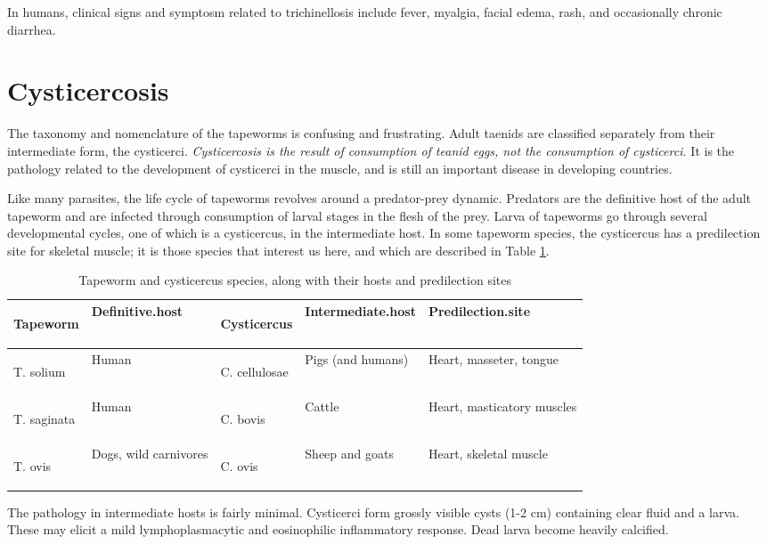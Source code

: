\documentclass[openany]{book}
\begin{document}
In humans, clinical signs and symptosm related to trichinellosis include
fever, myalgia, facial edema, rash, and occasionally chronic diarrhea.

\section{Cysticercosis}\label{cysticercosis}

The taxonomy and nomenclature of the tapeworms is confusing and
frustrating. Adult taenids are classified separately from their
intermediate form, the cysticerci. \emph{Cysticercosis is the result of
consumption of teanid eggs, not the consumption of cysticerci.} It is
the pathology related to the development of cysticerci in the muscle,
and is still an important disease in developing countries.

Like many parasites, the life cycle of tapeworms revolves around a
predator-prey dynamic. Predators are the definitive host of the adult
tapeworm and are infected through consumption of larval stages in the
flesh of the prey. Larva of tapeworms go through several developmental
cycles, one of which is a cysticercus, in the intermediate host. In some
tapeworm species, the cysticercus has a predilection site for skeletal
muscle; it is those species that interest us here, and which are
described in Table \ref{tab:cysti}.

\begin{table}[t]

\caption{\label{tab:cysti}Tapeworm and cysticercus species, along with their hosts and predilection sites}
\centering
\begin{tabular}{>{\em\raggedright\arraybackslash}p{5em}>{\raggedright\arraybackslash}p{10em}>{\em\raggedright\arraybackslash}p{7em}>{\raggedright\arraybackslash}p{6em}l}
\toprule
Tapeworm & Definitive.host & Cysticercus & Intermediate.host & Predilection.site\\
\midrule
T. solium & Human & C. cellulosae & Pigs (and humans) & Heart, masseter, tongue\\
T. saginata & Human & C. bovis & Cattle & Heart, masticatory muscles\\
T. ovis & Dogs, wild carnivores & C. ovis & Sheep and goats & Heart, skeletal muscle\\
\bottomrule
\end{tabular}
\end{table}

The pathology in intermediate hosts is fairly minimal. Cysticerci form
grossly visible cysts (1-2 cm) containing clear fluid and a larva. These
may elicit a mild lymphoplasmacytic and eosinophilic inflammatory
response. Dead larva become heavily calcified.


\end{document}
